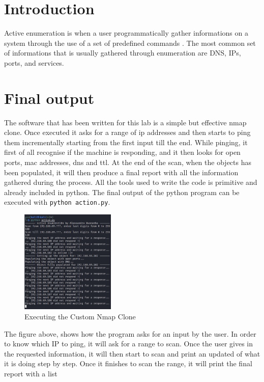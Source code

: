 \section{Introduction}
\label{s:lab2-introduction}
Active enumeration is when a user programmatically gather informations on a
system through the use of a set of predefined commands
\citep{cooperWhatDifferenceActive2020}. The most common set of informations that
is usually gathered through enumeration are DNS, IPs, ports, and services.

\section{Final output}
\label{s:lab2-final-output}
The software that has been written for this lab is a simple but effective nmap
clone. Once executed it asks for a range of ip addresses and then starts to ping
them incrementally starting from the first input till the end. While pinging, it
first of all recognise if the machine is responding, and it then looks for open
ports, mac addresses, dns and ttl. At the end of the scan, when the objects has
been populated, it will then produce a final report with all the information
gathered during the process. All the tools used to write the code is primitive and already
included in python. The final output of the python program can be executed
with \lstinline{python action.py}.
\begin{figure}[H]
  \centering
  \includegraphics[width=0.4\textwidth]{figures/scrolling-text}
  \caption{Executing the Custom Nmap Clone}
  \label{f:scrolling-text}
\end{figure}
The figure above, shows how the program asks for an input by the user. In order
to know which IP to ping, it will ask for a range to scan. Once the user gives
in the requested information, it will then start to scan and print an updated of
what it is doing step by step.
Once it finishes to scan the range, it will print the final report with a list
